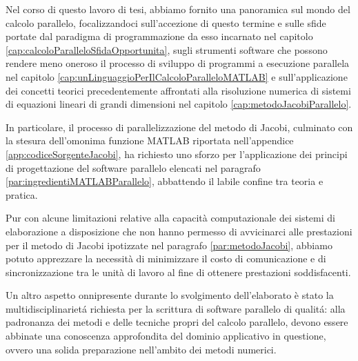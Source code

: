 Nel corso di questo lavoro di tesi, abbiamo fornito una panoramica sul mondo del calcolo parallelo, focalizzandoci sull'accezione di questo termine e sulle sfide portate dal paradigma di programmazione da esso incarnato nel capitolo \ref{cap:calcoloParalleloSfidaOpportunita}, sugli strumenti software che possono rendere meno oneroso il processo di sviluppo di programmi a esecuzione parallela
nel capitolo \ref{cap:unLinguaggioPerIlCalcoloParalleloMATLAB} e sull'applicazione dei concetti teorici precedentemente affrontati alla risoluzione numerica di sistemi di equazioni lineari di grandi dimensioni nel capitolo \ref{cap:metodoJacobiParallelo}.

In particolare, il processo di parallelizzazione del metodo di Jacobi, culminato con la stesura dell'omonima funzione 
MATLAB riportata nell'appendice \ref{app:codiceSorgenteJacobi}, ha richiesto uno sforzo per l'applicazione dei principi di progettazione del software parallelo elencati nel paragrafo \ref{par:ingredientiMATLABParallelo}, abbattendo il labile confine tra teoria e pratica.

Pur con alcune limitazioni relative alla capacit\`a computazionale dei sistemi di elaborazione a disposizione che non hanno 
permesso di avvicinarci alle prestazioni per il metodo di Jacobi ipotizzate nel paragrafo \ref{par:metodoJacobi}, 
abbiamo potuto apprezzare la necessit\`a di minimizzare il costo di comunicazione e di sincronizzazione tra le unit\`a di lavoro 
al fine di ottenere prestazioni soddisfacenti.

Un altro aspetto onnipresente durante lo svolgimento dell'elaborato \`e stato la multidisciplinariet\'a richiesta per la scrittura 
di software parallelo di qualit\'a: alla padronanza dei metodi e delle tecniche propri del calcolo parallelo, devono essere 
abbinate una conoscenza approfondita del dominio applicativo in questione, ovvero una solida preparazione nell'ambito dei metodi numerici.